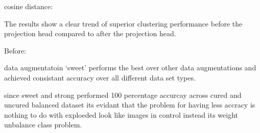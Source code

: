     \begin{table}[H]
        \centering
        \caption{Evaluation Results on Different Datasets and Augmentations with cosine distance}
        \label{tab:evaluation_results_cosine_distance}
    \end{table}
    

cosine distance:

The results show a clear trend of superior clustering performance before the projection head compared to after the projection head.

Before: 

data augmentatoin ‘sweet’ performs the best over other data augmentations and achieved consistant accuracy over all different data set types. 

since sweet and strong performed 100 percentage accurcay across cured and uncured balanced dataset its evidant that the problem for having less accracy is nothing
 to do with exploeded look like images in control instead its weight unbalance class problem. 

